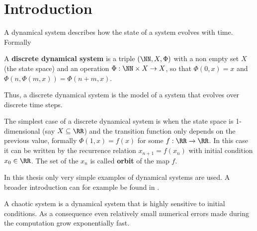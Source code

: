 \section{Introduction}
  A dynamical system describes how the state of a system evolves with time. Formally
  \begin{definition}
    A \textbf{discrete dynamical system} is a triple $(\NN,X,\Phi)$ with a non
    empty set $X$ (the state space) and an operation $\Phi : \NN \times X \to
    X$, so that $\Phi(0,x) = x$ and $\Phi(n,\Phi(m,x)) = \Phi(n+m, x)$. 
  \end{definition}
  Thus, a discrete dynamical system is the model of a system that evolves over discrete time steps.

  The simplest case of a discrete dynamical system is when the state space is 1-dimensional (say $X \subseteq \RR$) and 
  the transition function only depends on the previous value,
  formally $\Phi(1,x) = f(x)$ for some $f : \RR \to \RR$. 
  In this case it can be written by the recurrence relation $x_{n+1} = f(x_n)$ with initial condition $x_0 \in \RR$.
  The set of the $x_n$ is called \textbf{orbit} of the map $f$.

  In this thesis only very simple examples of dynamical systems are used. 
  A broader introduction can for example be found in \cite{katok1997introduction}.

  A chaotic system is a dynamical system that is highly sensitive to initial conditions.
  As a consequence even relatively small numerical errors made during the computation grow exponentially fast.

